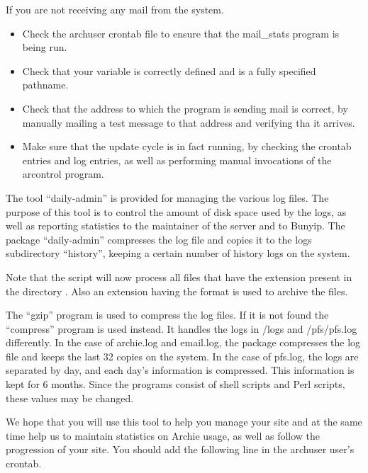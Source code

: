 If you are not receiving any mail from the system. \NOTE 


\begin{itemize}
\item
Check the archuser crontab file to ensure that the mail\_stats program is being run.

\item
Check that your  variable is correctly defined and is a fully specified pathname.

\item
Check that the address to which the program is sending mail is correct, by
manually mailing a test message to that address and verifying tha it arrives.

\item
Make sure that the update cycle is in fact running, by checking the crontab
entries and log entries, as well as performing manual invocations of the
arcontrol program.

\end{itemize}


The tool ``daily-admin'' is provided for managing the various log files. The
purpose of this tool is to control the amount of disk space used by the logs,
as well as reporting statistics to the maintainer of the server and to
Bunyip. The package ``daily-admin'' compresses the log file and copies it to
the logs subdirectory ``history'', keeping a certain number of history logs on
the system.

Note that the script will now process all files that have the extension
 present in the directory . Also an extension
having the format  is used to archive the files. \new
 
The ``gzip'' program is used to compress the log files. If it is not found
the ``compress'' program is used instead. It handles the logs in \archie/logs
and \archie/pfs/pfs.log differently. In the case of archie.log and email.log,
the package compresses the log file and keeps the last 32 copies on the
system. In the case of pfs.log, the logs are separated by day, and each day's
information is compressed. This information is kept for 6 months. Since
the programs consist of shell scripts and Perl scripts, these values may be
changed.



We hope that you will use this tool to help you manage your site and at the
same time help us to maintain statistics on Archie usage, as well as follow
the progression of your site. You should add the following line in the
archuser user's crontab.



